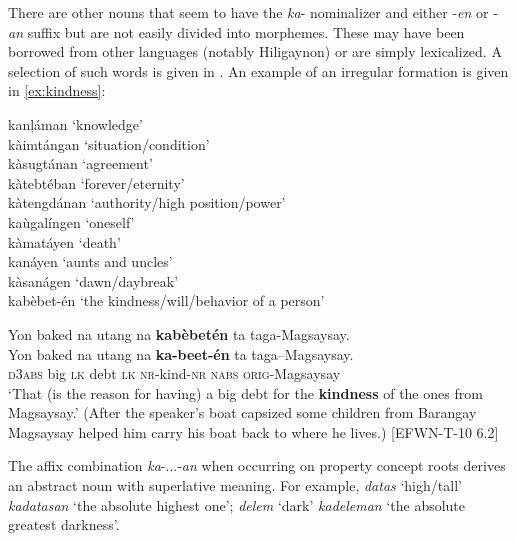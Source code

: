 There are other nouns that seem to have the \textit{ka}{}- nominalizer and either -\textit{en} or -\textit{an} suffix but are not easily divided into morphemes. These may have been borrowed from other languages (notably Hiligaynon) or are simply lexicalized. A selection of such words is given in . An example of an irregular formation is given in \ref{ex:kindness}:

\ea
\label{bkm:Ref51161274}
kanļáman ‘knowledge’ \\
kàimtángan ‘situation/condition’ \\
kàsugtánan ‘agreement’ \\
kàtebtéban ‘forever/eternity’ \\
kàtengdánan ‘authority/high position/power’ \\
kaùgalíngen ‘oneself’ \\
kàmatáyen ‘death’ \\
kanáyen ‘aunts and uncles’ \\
kàsanágen ‘dawn/daybreak’ \\   
kabèbet-én ‘the kindness/will/behavior of a person’\footnotemark
\z
{}

\ea
\label{ex:kindness}
Yon  baked  na  utang  na  \textbf{kabèbetén}  ta  taga-Magsaysay. \\\smallskip
 \gll Yon  baked  na  utang  na  \textbf{ka-beet-én}  ta  taga--Magsaysay. \\
\textsc{d3abs}  big  \textsc{lk}  debt  \textsc{lk}  \textsc{nr-}kind-\textsc{nr}  \textsc{nabs}  \textsc{orig}-Magsaysay \\
\glt ‘That (is the reason for having) a big debt for the \textbf{kindness} of the ones from Magsaysay.’ (After the speaker's boat capsized some children from Barangay Magsaysay helped him carry his boat back to where he lives.) [EFWN-T-10 6.2] 
\z

The affix combination \textit{ka}{}-...-\textit{an} when occurring on property concept roots derives an abstract noun with superlative meaning. For example, \textit{datas} ‘high/tall’ \rightarrow {} \textit{kadatasan} ‘the absolute highest one’; \textit{delem} ‘dark’ \rightarrow {} \textit{kadeleman} ‘the absolute greatest darkness’.

